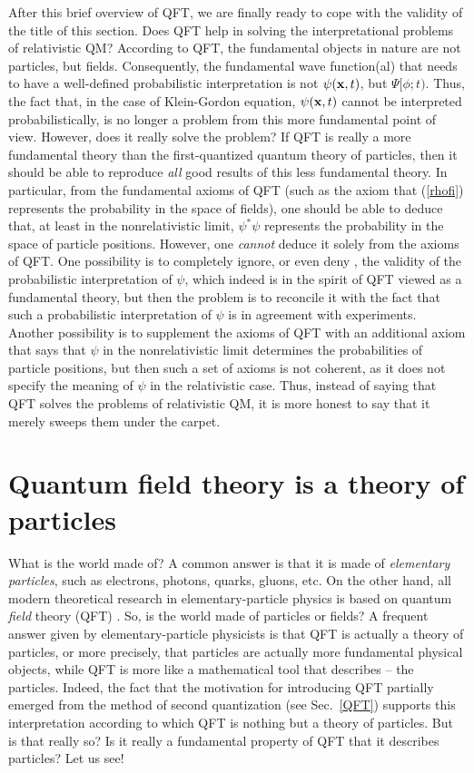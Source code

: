\documentclass[12pt]{article}
\begin{document}
After this brief overview of QFT, we are finally ready 
to cope with the validity of the title of this section. 
Does QFT help in solving the interpretational problems 
of relativistic QM? According to QFT, the fundamental 
objects in nature are not particles, but fields.
Consequently, the fundamental wave function(al) that
needs to have a well-defined probabilistic interpretation 
is not $\psi({\bf x},t)$, but $\Psi[\phi;t)$. 
Thus, the fact that, in the case of Klein-Gordon equation,
$\psi({\bf x},t)$ cannot be interpreted 
probabilistically, is no longer a problem from this more 
fundamental point of view. However, does it really solve 
the problem? If QFT is really a more fundamental 
theory than the first-quantized quantum theory of 
particles, then it should be able to reproduce {\em all}
good results of this less fundamental theory. 
In particular, from the fundamental 
axioms of QFT (such as the axiom that (\ref{rhofi}) represents 
the probability in the space of fields), one should be able to deduce 
that, at least in the nonrelativistic limit, $\psi^*\psi$ represents 
the probability in the space of particle positions. 
However, one {\em cannot} deduce it solely from the axioms of 
QFT. One possibility is to 
completely ignore, or even deny \cite{zeh}, the validity of the 
probabilistic interpretation of 
$\psi$, which indeed is in the spirit of QFT viewed as a fundamental 
theory, but then the problem is to reconcile it with the 
fact that such a probabilistic interpretation of $\psi$
is in agreement with experiments. Another possibility 
is to supplement the axioms of QFT with an additional 
axiom that says that $\psi$ in the nonrelativistic limit 
determines the probabilities of particle positions, 
but then such a set of axioms is not coherent, as it does not 
specify the meaning of $\psi$ in the relativistic case.
Thus, instead of saying that QFT solves the problems of 
relativistic QM, it is more honest to say that it merely sweeps 
them under the carpet.            
 
\section{Quantum field theory is a theory of particles}
\label{QFTP}

What is the world made of? A common answer is that it is made 
of {\em elementary particles}, such as electrons, photons, quarks, 
gluons, etc. On the other hand, all modern theoretical 
research in elementary-particle physics is based on 
quantum {\em field} theory (QFT) \cite{BD2,ryder,cheng}. 
So, is the world made of 
particles or fields? A frequent answer given by 
elementary-particle physicists is that QFT is actually
a theory of particles, or more precisely, that particles are actually more 
fundamental physical objects, while QFT is more like a mathematical tool 
that describes -- the particles. Indeed, the fact that the motivation 
for introducing QFT partially emerged from the method of second
quantization (see Sec.~\ref{QFT}) supports this interpretation 
according to which QFT is nothing but a theory of particles. 
But is that really so?
Is it really a fundamental property of QFT that it describes particles?
Let us see! 
\end{document}
